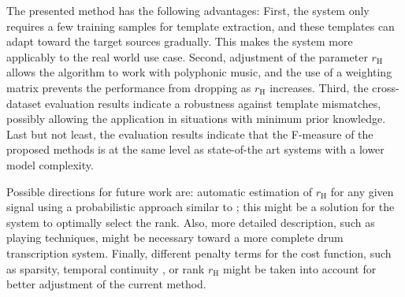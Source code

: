 \documentclass{article}
\begin{document}
The presented method has the following advantages: 
First, the system only requires a few training samples for template extraction, and these templates can adapt toward the target sources gradually. This makes the system more applicably to the real world use case. 
Second, adjustment of the parameter $r_\mathrm{H}$ allows the algorithm to work with polyphonic music, and the use of a weighting matrix prevents the performance from dropping as $r_\mathrm{H}$ increases. 
Third, the cross-dataset evaluation results indicate a robustness against template mismatches, possibly allowing the application in situations with minimum prior knowledge. 
Last but not least, the evaluation results indicate that the F-measure of the proposed methods is at the same level as state-of-the art systems with a lower model complexity. 

Possible directions for future work are:
automatic estimation of $r_\mathrm{H}$ for any given signal using a probabilistic approach similar to  \cite{ouo_inmf_2010}; this might be a solution for the system to optimally select the rank. Also, more detailed description, such as playing techniques, might be necessary toward a more complete drum transcription system. Finally, different penalty terms for the cost function, such as sparsity, temporal continuity \cite{virtanen_ssnmf_2007}, or rank $r_\mathrm{H}$ might be taken into account for better adjustment of the current method.   


\end{document}
